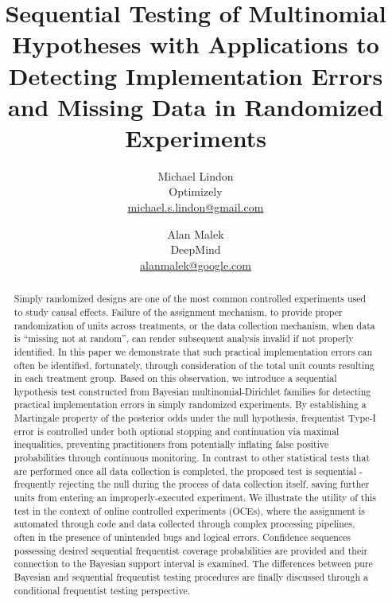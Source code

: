 \documentclass[11pt]{article}
\begin{document}
\vspace{-1in}
\title{Sequential Testing of Multinomial Hypotheses with Applications to Detecting Implementation Errors and Missing Data in Randomized Experiments}
\author{\Large Michael Lindon \\ Optimizely \\ \href{mailto:michael.s.lindon@gmail.com}{michael.s.lindon@gmail.com}  \and \Large Alan Malek \\ DeepMind \\ \href{mailto:alanmalek@google.com}{alanmalek@google.com}}
\maketitle 
\begin{abstract}
  Simply randomized designs are one of the most common controlled experiments used to study causal effects.
  Failure of the assignment mechanism, to provide proper randomization of units across treatments, or the data collection mechanism, when data is ``missing not at random'', can render subsequent analysis invalid if not properly identified.
In this paper we demonstrate that such practical implementation errors can often be identified, fortunately, through consideration of the total unit counts resulting in each treatment group.
  Based on this observation, we introduce a sequential hypothesis test constructed from Bayesian multinomial-Dirichlet families for detecting practical implementation errors in simply randomized experiments.
By establishing a Martingale property of the posterior odds under the null hypothesis, frequentist Type-I error is controlled under both optional stopping and continuation via maximal inequalities, preventing practitioners from potentially inflating false positive probabilities through continuous monitoring.
  In contrast to other statistical tests that are performed once all data collection is completed, the proposed test is sequential - frequently rejecting the null during the process of data collection itself, saving further units from entering an improperly-executed experiment.
  We illustrate the utility of this test in the context of online controlled experiments (OCEs), where the assignment is automated through code and data collected through complex processing pipelines, often in the presence of unintended bugs and logical errors.
Confidence sequences possessing desired sequential frequentist coverage probabilities are provided and their connection to the Bayesian support interval is examined.
The differences between pure Bayesian and sequential frequentist testing procedures are finally discussed through a conditional frequentist testing perspective.
 
\end{abstract}
\end{document}
